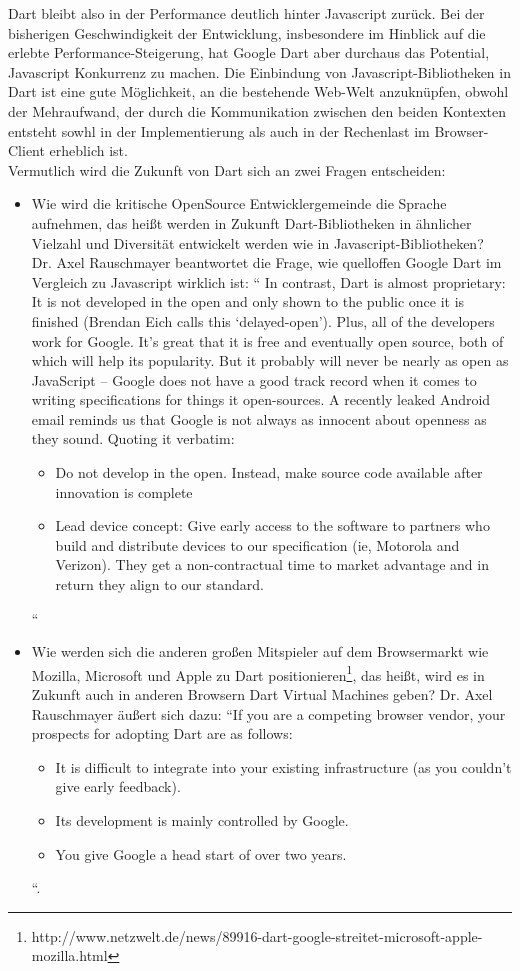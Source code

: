 Dart bleibt also in der Performance deutlich hinter Javascript zurück. Bei der bisherigen Geschwindigkeit der Entwicklung, insbesondere im Hinblick auf die erlebte Performance-Steigerung, hat Google Dart aber durchaus das Potential, Javascript Konkurrenz zu machen.
Die Einbindung von Javascript-Bibliotheken in Dart ist eine gute Möglichkeit, an die bestehende Web-Welt anzuknüpfen, obwohl der Mehraufwand, der durch die Kommunikation zwischen den beiden Kontexten entsteht sowhl in der Implementierung als auch in der Rechenlast im Browser-Client erheblich ist.\\
Vermutlich wird die Zukunft von Dart sich an zwei Fragen entscheiden:

\begin{itemize}
\item Wie wird die kritische OpenSource Entwicklergemeinde die Sprache aufnehmen, das heißt werden in Zukunft Dart-Bibliotheken in ähnlicher Vielzahl und Diversität entwickelt werden wie in Javascript-Bibliotheken? 
\\
Dr. Axel Rauschmayer beantwortet die Frage, wie quelloffen Google Dart im Vergleich zu Javascript wirklich ist: “
In contrast, Dart is almost proprietary: It is not developed in the open and only shown to the public once it is finished (Brendan Eich calls this ‘delayed-open’). Plus, all of the developers work for Google. It’s great that it is free and eventually open source, both of which will help its popularity. But it probably will never be nearly as open as JavaScript – Google does not have a good track record when it comes to writing specifications for things it open-sources. A recently leaked Android email reminds us that Google is not always as innocent about openness as they sound. Quoting it verbatim:
\begin{itemize}
    \item Do not develop in the open. Instead, make source code available after innovation is complete
    \item Lead device concept: Give early access to the software to partners who build and distribute devices to our specification (ie, Motorola and Verizon). They get a non-contractual time to market advantage and in return they align to our standard.
    \end{itemize}“\cite{google-dart}
\item Wie werden sich die anderen großen Mitspieler auf dem Browsermarkt wie Mozilla, Microsoft und Apple zu Dart positionieren\footnote{http://www.netzwelt.de/news/89916-dart-google-streitet-microsoft-apple-mozilla.html}, das heißt, wird es in Zukunft auch in anderen Browsern Dart Virtual Machines geben?
Dr. Axel Rauschmayer äußert sich dazu: “If you are a competing browser vendor, your prospects for adopting Dart are as follows:
\begin{itemize}
\item    It is difficult to integrate into your existing infrastructure (as you couldn’t give early feedback).
\item    Its development is mainly controlled by Google.
\item    You give Google a head start of over two years.
\end{itemize}
“\cite{google-dart}.
\end{itemize}